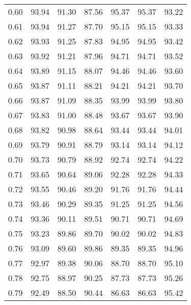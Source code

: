 \begin{tabular}{|c|c|c|c|c|c|c|}
      0.60 &     93.94 &     91.30 &      87.56 &   95.37 &      95.37 &         93.22 \\
      0.61 &     93.94 &     91.27 &      87.70 &   95.15 &      95.15 &         93.33 \\
      0.62 &     93.93 &     91.25 &      87.83 &   94.95 &      94.95 &         93.42 \\
      0.63 &     93.92 &     91.21 &      87.96 &   94.71 &      94.71 &         93.52 \\
      0.64 &     93.89 &     91.15 &      88.07 &   94.46 &      94.46 &         93.60 \\
      0.65 &     93.87 &     91.11 &      88.21 &   94.21 &      94.21 &         93.70 \\
      0.66 &     93.87 &     91.09 &      88.35 &   93.99 &      93.99 &         93.80 \\
      0.67 &     93.83 &     91.00 &      88.48 &   93.67 &      93.67 &         93.90 \\
      0.68 &     93.82 &     90.98 &      88.64 &   93.44 &      93.44 &         94.01 \\
      0.69 &     93.79 &     90.91 &      88.79 &   93.14 &      93.14 &         94.12 \\
      0.70 &     93.73 &     90.79 &      88.92 &   92.74 &      92.74 &         94.22 \\
      0.71 &     93.65 &     90.64 &      89.06 &   92.28 &      92.28 &         94.33 \\
      0.72 &     93.55 &     90.46 &      89.20 &   91.76 &      91.76 &         94.44 \\
      0.73 &     93.46 &     90.29 &      89.35 &   91.25 &      91.25 &         94.56 \\
      0.74 &     93.36 &     90.11 &      89.51 &   90.71 &      90.71 &         94.69 \\
      0.75 &     93.23 &     89.86 &      89.70 &   90.02 &      90.02 &         94.83 \\
      0.76 &     93.09 &     89.60 &      89.86 &   89.35 &      89.35 &         94.96 \\
      0.77 &     92.97 &     89.38 &      90.06 &   88.70 &      88.70 &         95.10 \\
      0.78 &     92.75 &     88.97 &      90.25 &   87.73 &      87.73 &         95.26 \\
      0.79 &     92.49 &     88.50 &      90.44 &   86.63 &      86.63 &         95.42 \\

\end{tabular}
